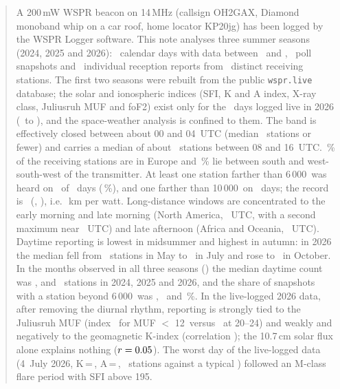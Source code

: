 \documentclass[10pt,a4paper]{article}
\begin{document}

\begin{abstract}\noindent
A 200\,mW WSPR beacon on 14\,MHz (callsign OH2GAX, Diamond monoband whip on a car roof, home locator KP20jg) has been logged by the WSPR Logger software. This note analyses three summer seasons (2024, 2025 and 2026): \nDays\ calendar days with data between \dateFrom\ and \dateTo, \nSnap\ poll snapshots and \nRows\ individual reception reports from \nStations\ distinct receiving stations. The first two seasons were rebuilt from the public \texttt{wspr.live} database; the solar and ionospheric indices (SFI, K and A index, X-ray class, Juliusruh MUF and foF2) exist only for the \swDays\ days logged live in 2026 (\swFrom\ to \swTo), and the space-weather analysis is confined to them. The band is effectively closed between about 00 and 04~UTC (median \quietMedMax\ stations or fewer) and carries a median of about \busyMedAvg\ stations between 08 and 16~UTC. \zpeurope\,\% of the receiving stations are in Europe and \swPct\,\% lie between south and west-south-west of the transmitter. At least one station farther than 6\,000\km\ was heard on \daysDXsix\ of \nDays\ days (\pctDaysDXsix\,\%), and one farther than 10\,000\km\ on \daysDXten\ days; the record is \recBest\km\ (\recBestCall, \recBestDate), i.e.\ \wKmW\,km per watt. Long-distance windows are concentrated to the early morning and late morning (North America, \peaknamerica\ UTC, with a second maximum near \peakhnamerica~UTC) and late afternoon (Africa and Oceania, \peakafrica\ UTC). Daytime reporting is lowest in midsummer and highest in autumn: in 2026 the median fell from \monCACGAF\ stations in May to \monCACGAH\ in July and rose to \monCACGBA\ in October. In the months observed in all three seasons (\commonNames) the median daytime count was \coCACEMed, \coCACFMed and \coCACGMed\ stations in 2024, 2025 and 2026, and the share of snapshots with a station beyond 6\,000\km\ was \coCACEDx, \coCACFDx\ and \coCACGDx\,\%. In the live-logged 2026 data, after removing the diurnal rhythm, reporting is strongly tied to the Juliusruh MUF (index \mufIdxLow\ for MUF $<$ 12\MHz\ versus \mufIdxMid\ at 20--24\MHz) and weakly and negatively to the geomagnetic K-index (correlation \rKRel); the 10.7\,cm solar flux alone explains nothing ($r=\rSfiRel$). The worst day of the live-logged data (4~July 2026, K\,=\,\caseJulyK, A\,=\,\caseJulyA, \caseJulyRep\ stations against a typical \caseTypRep) followed an M-class flare period with SFI above 195.
\end{abstract}
\vspace{-4pt}
{\small\tableofcontents}
\end{document}
